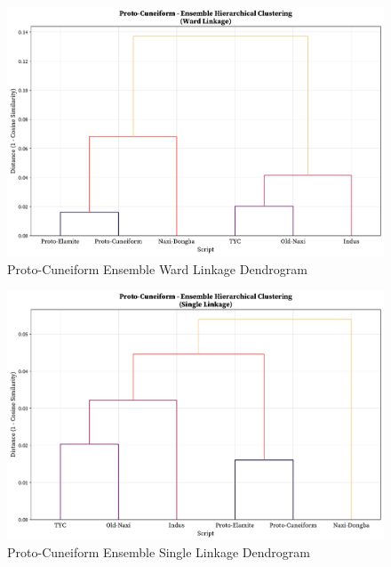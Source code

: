 \documentclass[11pt,a4paper,oneside]{report}
\begin{document}
\begin{figure}[H] 
    \centering
    \includegraphics[width=1\linewidth]{Visualizations/Dendrograms/Proto-Cuneiform/ensemble_dendrogram_ward.pdf}
     \caption*{Proto-Cuneiform Ensemble Ward Linkage Dendrogram}
\end{figure}

\begin{figure}[H] 
    \centering
    \includegraphics[width=1\linewidth]{Visualizations/Dendrograms/Proto-Cuneiform/ensemble_dendrogram_single.pdf}
     \caption*{Proto-Cuneiform Ensemble Single Linkage Dendrogram}
\end{figure}
\end{document}
